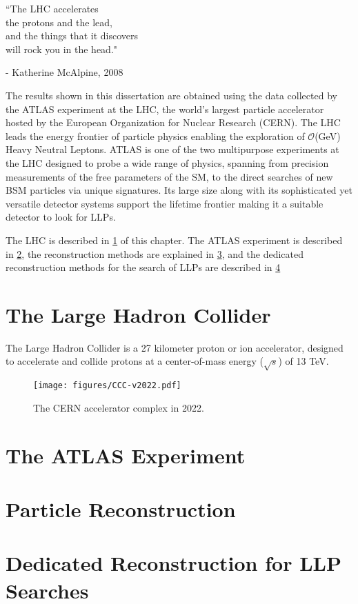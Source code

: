 \vspace{1in}
{\large
``The LHC accelerates \\
the protons and the lead, \\
and the things that it discovers \\
will rock you in the head."

\hfill - Katherine McAlpine, 2008}
\vspace{1in}

The results shown in this dissertation are obtained using the data collected by the ATLAS experiment at the LHC, the world's largest particle accelerator hosted by the European Organization for Nuclear Research (CERN). The LHC leads the energy frontier of particle physics enabling the exploration of $\mathcal{O}$(GeV) Heavy Neutral Leptons. ATLAS is one of the two multipurpose experiments at the LHC designed to probe a wide range of physics, spanning from precision measurements of the free parameters of the SM, to the direct searches of new BSM particles via unique signatures. Its large size along with its sophisticated yet versatile detector systems support the lifetime frontier making it a suitable detector to look for LLPs.

The LHC is described in \cref{sec:lhc} of this chapter. The ATLAS experiment is described in \cref{sec:atlas}, the reconstruction methods are explained in \cref{sec:reco}, and the dedicated reconstruction methods for the search of LLPs are described in \cref{sec:llp_reco}

\section{The Large Hadron Collider} \label{sec:lhc}

The Large Hadron Collider is a 27 kilometer proton or ion accelerator, designed to accelerate and collide protons at a center-of-mass energy ($\sqrt{s}$) of 13 TeV.

\begin{figure}
    \centering
    \texttt{[image: figures/CCC-v2022.pdf]}
    \caption{The CERN accelerator complex in 2022.\cite{Lopienska:2800984}}
    \label{fig:cern-acc-comp}
\end{figure}

\section{The ATLAS Experiment} \label{sec:atlas}

\section{Particle Reconstruction} \label{sec:reco}

\section{Dedicated Reconstruction for LLP Searches} \label{sec:llp_reco}